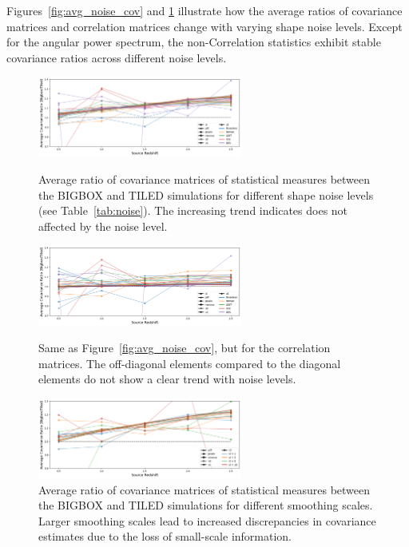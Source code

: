 Figures~\ref{fig:avg_noise_cov} and \ref{fig:avg_noise_corr} illustrate how the average ratios of covariance matrices and correlation matrices change with varying shape noise levels. Except for the angular power spectrum, the non-Correlation statistics exhibit stable covariance ratios across different noise levels. 

\begin{figure}
    \centering
    \includegraphics[width=0.6\textwidth]{figures/results/avg_cov_ratio_ngal.png}
    \caption{Average ratio of covariance matrices of statistical measures between the BIGBOX and TILED simulations for different shape noise levels (see Table~\ref{tab:noise}). The increasing trend indicates does not affected by the noise level.}
    \label{fig:avg_noise_cov}
    \vspace{0.5cm}
    \includegraphics[width=0.6\textwidth]{figures/results/avg_corr_ratio_ngal.png}
    \caption{Same as Figure~\ref{fig:avg_noise_cov}, but for the correlation matrices. The off-diagonal elements compared to the diagonal elements do not show a clear trend with noise levels.}
    \label{fig:avg_noise_corr}
    \vspace{0.5cm}
    \includegraphics[width=0.6\textwidth]{figures/results/avg_cov_ratio_sl.png}
    \caption{Average ratio of covariance matrices of statistical measures between the BIGBOX and TILED simulations for different smoothing scales. Larger smoothing scales lead to increased discrepancies in covariance estimates due to the loss of small-scale information.}

\end{figure}

